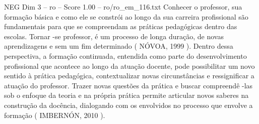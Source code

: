 \begin{textsample}{NEG Dim 3 – ro – Score 1.00 – ro/ro\_em\_116.txt}
Conhecer o professor, sua formação básica e como ele se constrói ao longo da sua carreira profissional são fundamentais para que se compreendam as práticas pedagógicas dentro das escolas.
Tornar -se professor, é um processo de longa duração, de novas aprendizagens e sem um fim determinado ( NÓVOA, 1999 ).
Dentro dessa perspectiva, a formação continuada, entendida como parte do desenvolvimento profissional que acontece ao longo da atuação docente, pode possibilitar um novo sentido à prática pedagógica, contextualizar novas circunstâncias e ressignificar a atuação do professor.
Trazer novas questões da prática e buscar compreendê -las sob o enfoque da teoria e na própria prática permite articular novos saberes na construção da docência, dialogando com os envolvidos no processo que envolve a formação ( IMBERNÓN, 2010 ).

\end{textsample}
